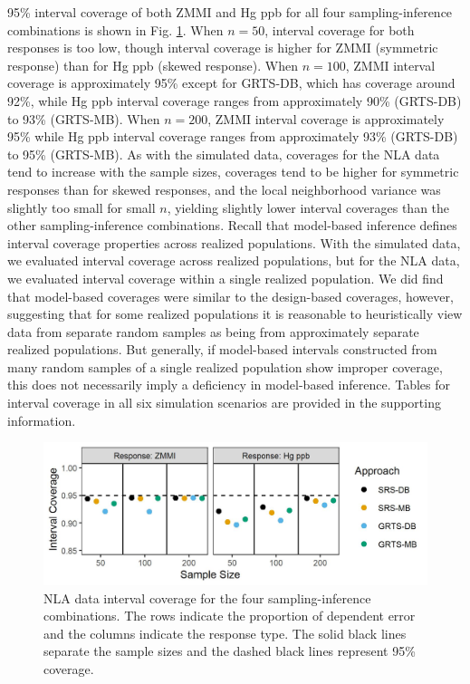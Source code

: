 \documentclass[]{elsarticle} %
\begin{document}
95\% interval coverage of both ZMMI and Hg ppb for all four
sampling-inference combinations is shown in Fig. \ref{fig:data_figconf}.
When \(n = 50\), interval coverage for both responses is too low, though
interval coverage is higher for ZMMI (symmetric response) than for Hg
ppb (skewed response). When \(n = 100\), ZMMI interval coverage is
approximately 95\% except for GRTS-DB, which has coverage around 92\%,
while Hg ppb interval coverage ranges from approximately 90\% (GRTS-DB)
to 93\% (GRTS-MB). When \(n = 200\), ZMMI interval coverage is
approximately 95\% while Hg ppb interval coverage ranges from
approximately 93\% (GRTS-DB) to 95\% (GRTS-MB). As with the simulated
data, coverages for the NLA data tend to increase with the sample sizes,
coverages tend to be higher for symmetric responses than for skewed
responses, and the local neighborhood variance was slightly too small
for small \(n\), yielding slightly lower interval coverages than the
other sampling-inference combinations. Recall that model-based inference
defines interval coverage properties across realized populations. With
the simulated data, we evaluated interval coverage across realized
populations, but for the NLA data, we evaluated interval coverage within
a single realized population. We did find that model-based coverages
were similar to the design-based coverages, however, suggesting that for
some realized populations it is reasonable to heuristically view data
from separate random samples as being from approximately separate
realized populations. But generally, if model-based intervals
constructed from many random samples of a single realized population
show improper coverage, this does not necessarily imply a deficiency in
model-based inference. Tables for interval coverage in all six
simulation scenarios are provided in the supporting information.

\begin{figure}
  \centering
  \includegraphics[width = 1\linewidth]{figures/data_coverage.jpeg}
  \caption{NLA data interval coverage for the four sampling-inference combinations. The rows indicate the proportion of dependent error and the columns indicate the response type. The solid black lines separate the sample sizes and the dashed black lines represent 95\% coverage.}
  \label{fig:data_figconf}
\end{figure}
\end{document}
